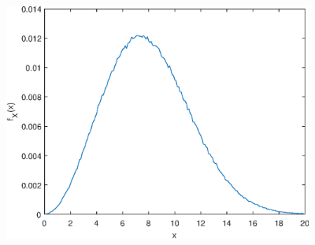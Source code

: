 \documentclass[12pt]{article}
\begin{document}
\includegraphics [width=4in]{prob7_43_02.eps}
\end{document}
